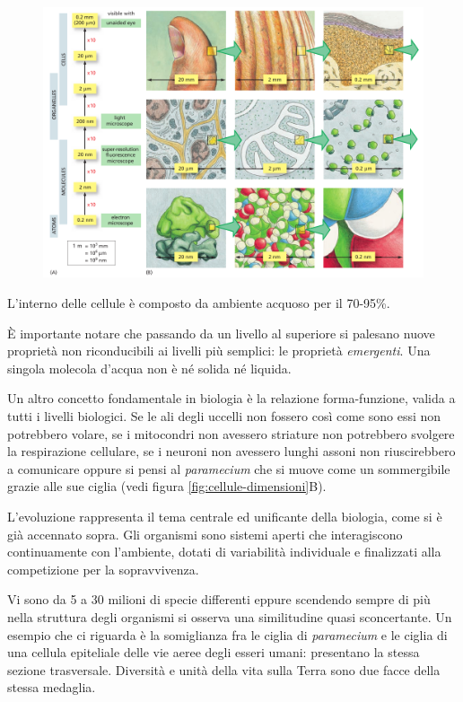 \begin{figure}[!h]
	\centering
	\includegraphics[scale=0.3]{images/grandezze.png}
\end{figure}

L'interno delle cellule è composto da ambiente acquoso per il 70-95\%.

\par È importante notare che passando da un livello al superiore si palesano nuove proprietà non riconducibili ai livelli più semplici: le proprietà \textit{emergenti}. Una singola molecola d'acqua non è né solida né liquida.
\par Un altro concetto fondamentale in biologia è la relazione forma-funzione, valida a tutti i livelli biologici. Se le ali degli uccelli non fossero così come sono essi non potrebbero volare, se i mitocondri non avessero striature non potrebbero svolgere la respirazione cellulare, se i neuroni non avessero lunghi assoni non riuscirebbero a comunicare oppure si pensi al \textit{paramecium} che si muove come un sommergibile grazie alle sue ciglia (vedi figura \ref{fig:cellule-dimensioni}B).

\par L'evoluzione rappresenta il tema centrale ed unificante della biologia, come si è già accennato sopra. Gli organismi sono sistemi aperti che interagiscono continuamente con l'ambiente, dotati di variabilità individuale e finalizzati alla competizione per la sopravvivenza. 

\par Vi sono da 5 a 30 milioni di specie differenti eppure scendendo sempre di più nella struttura degli organismi si osserva una similitudine quasi sconcertante. Un esempio che ci riguarda è la somiglianza fra le ciglia di \textit{paramecium} e le ciglia di una cellula epiteliale delle vie aeree degli esseri umani: presentano la stessa sezione trasversale. Diversità e unità della vita sulla Terra sono due facce della stessa medaglia.

